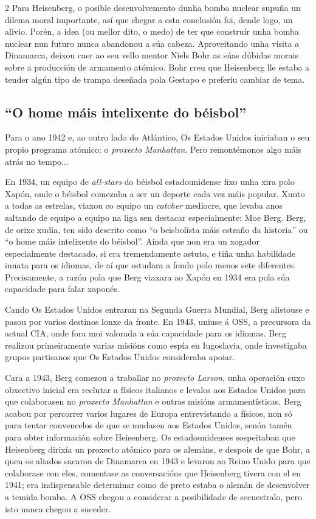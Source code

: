 \begin{refsection}
\begin{multicols}{2}
Para Heisenberg, o posible desenvolvemento dunha bomba nuclear supuña un dilema
moral importante, así que chegar a esta conclusión foi, dende logo, un alivio.
Porén, a idea (ou mellor dito, o medo) de ter que construír unha bomba nuclear
nun futuro nunca abandonou a súa cabeza. Aproveitando unha visita a Dinamarca,
deixou caer ao seu vello mentor Niels Bohr as súas dúbidas morais sobre a
producción de armamento atómico. Bohr creu que Heisenberg lle estaba a tender
algún tipo de trampa deseñada pola Gestapo e preferiu cambiar de tema.

\subsection*{``O home máis intelixente do béisbol''}

Para o ano 1942 e, ao outro lado do Atlántico, Os Estados Unidos iniciaban o
seu propio programa atómico: o \textit{proxecto Manhattan}. Pero remontémonos
algo máis atrás no tempo...

En 1934, un equipo de \textit{all-stars} do béisbol estadounidense fixo unha
xira polo Xapón, onde o béisbol comezaba a ser un deporte cada vez máis popular.
Xunto a todas as estrelas, viaxou co equipo un \textit{catcher} mediocre, que
levaba anos saltando de equipo a equipo na liga sen destacar especialmente: Moe
Berg. Berg, de orixe xudía, ten sido descrito como ``o beisbolista máis estraño
da historia'' ou ``o home máis intelixente do béisbol''. Aínda que non era un
xogador especialmente destacado, si era tremendamente astuto, e tiña unha
habilidade innata para os idiomas, de aí que estudara a fondo polo menos sete
diferentes. Precisamente, a razón pola que Berg viaxara ao Xapón en 1934 era
pola súa capacidade para falar xaponés.

Cando Os Estados Unidos entraran na Segunda Guerra Mundial, Berg alistouse e
pasou por varios destinos lonxe da fronte. En 1943, uniuse á OSS, a precursora
da actual CIA, onde fora moi valorada a súa capacidade para os idiomas. Berg
realizou primeiramente varias misións como espía en Iugoslavia, onde
investigaba grupos partisanos que Os Estados Unidos consideraba apoiar.

Cara a 1943, Berg comezou a traballar no \textit{proxecto Larson}, unha
operación cuxo obxectivo inicial era reclutar a físicos italianos e levalos aos
Estados Unidos para que colaborasen no \textit{proxecto Manhattan} e outras
misións armamentísticas. Berg acabou por percorrer varios lugares de Europa
entrevistando a físicos, non só para tentar convencelos de que se mudasen aos
Estados Unidos, senón tamén para obter información sobre Heisenberg. Os
estadounidenses sospeitaban que Heisenberg dirixía un proxecto atómico para os
alemáns, e despois de que Bohr, a quen os aliados sacaron de Dinamarca en 1943
e levaron ao Reino Unido para que colaborase con eles, comentase as
conversacións que Heisenberg tivera con el en 1941; era indispensable
determinar como de preto estaba o alemán de desenvolver a temida bomba. A OSS
chegou a considerar a posibilidade de secuestralo, pero isto nunca chegou a
suceder.


\end{multicols}
\end{refsection}
